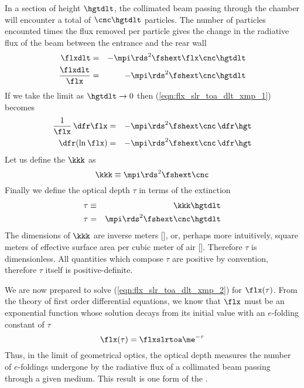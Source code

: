 \documentclass[12pt]{article}
\begin{document}
In a section of height $\hgtdlt$, the collimated beam passing
through the chamber will encounter a total of $\cnc \hgtdlt$
particles. 
The number of particles encounted times the flux removed per particle
gives the change in the radiative flux of the beam between the
entrance and the rear wall
\begin{eqnarray}
\flxdlt & = & - \mpi \rds^{2} \fshext \flx \cnc \hgtdlt \nonumber \\
\frac{\flxdlt}{\flx} & = & - \mpi \rds^{2} \fshext \cnc \hgtdlt
\label{eqn:flx_slr_toa_dlt_xmp_1}
\end{eqnarray}
If we take the limit as $\hgtdlt \rightarrow 0$ then
(\ref{eqn:flx_slr_toa_dlt_xmp_1}) becomes 
\begin{eqnarray}
\frac{1}{\flx} \,\dfr\flx & = & -  \mpi \rds^{2} \fshext \cnc \,\dfr\hgt
\nonumber \\
{\dfr(\ln \flx)} & = & - \mpi \rds^{2} \fshext \cnc \,\dfr\hgt
\label{eqn:flx_slr_toa_dlt_xmp_2}
\end{eqnarray}
Let us define the  $\kkk$ as
\begin{equation}
\kkk \equiv \mpi \rds^{2} \fshext \cnc
\label{eqn:ext_xmp_2}
\end{equation}
Finally we define the optical depth $\tau$ in terms of the extinction
\begin{eqnarray}
\tau & \equiv & \kkk \hgtdlt \\
\tau & = & \mpi \rds^{2} \fshext \cnc \hgtdlt
\label{eqn:tau_xmp_2}
\end{eqnarray}
The dimensions of $\kkk$ are inverse meters [\xm], or, perhaps more
intuitively, square meters of effective surface area per cubic meter
of air [\mSxmC].
Therefore $\tau$ is dimensionless. 
All quantities which compose $\tau$ are positive by convention,
therefore $\tau$ itself is positive-definite.

We are now prepared to solve (\ref{eqn:flx_slr_toa_dlt_xmp_2}) for
$\flx(\tau)$. 
From the theory of first order differential equations, we know that
$\flx$ must be an exponential function whose solution decays from its
initial value with an $e$-folding constant of $\tau$ 
\begin{equation}
\flx(\tau) = \flxslrtoa \me^{-\tau}
\label{eqn:flx_slr_toa_dlt_xmp_4}
\end{equation}
Thus, in the limit of geometrical optics, the optical depth measures
the number of $e$-foldings undergone by the radiative flux of a
collimated beam passing through a given medium.  
This result is one form of the .
\end{document}
